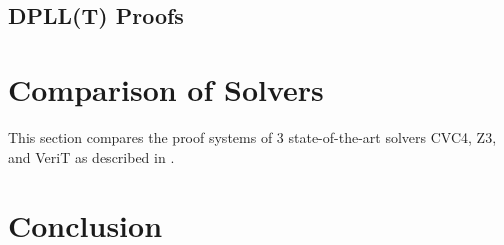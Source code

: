 \documentclass{article}
\begin{document}
\subsection{DPLL(T) Proofs}
\label{sec:dplltproofs}

\section{Comparison of Solvers}
\label{sec:comp}
This section compares the proof systems of 3 state-of-the-art 
solvers CVC4, Z3, and VeriT as described in .

\section{Conclusion}
\label{sec:conc}



\end{document}
